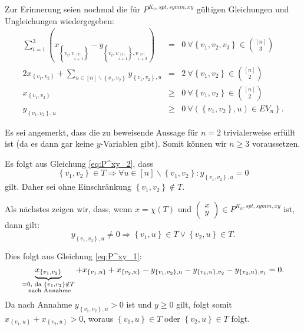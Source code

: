 \documentclass[10p,a4paper,BCOR = 12mm, DIV=15]{scrbook}
\begin{document}
\begin{bew}
Zur Erinnerung seien nochmal die für $P^{K_n, spt, symm, xy}$ gültigen Gleichungen und Ungleichungen wiedergegeben:
\begin{eqnarray}
\sum_{i=1}^3 \left(x_{\left\{v_{i}, v_{i \stackrel{\left[3\right]}{+} 1}\right\}} -  y_{\left\{v_{i}, v_{i \stackrel{\left[3\right]}{+} 1}\right\}, v_{i \stackrel{\left[3\right]}{+} 2}}\right) & = & 0\ \forall \left\{v_1, v_2, v_3\right\}\in {[n] \choose 3} \label{eq:P^xy_1} \\
2 x_{\left\{v_1, v_2\right\}} + \sum_{u\in[n]\backslash\left\{v_1, v_2\right\}} y_{\left\{v_1, v_2\right\}, u} & = & 2\ \forall \left\{v_1, v_2\right\}\in {[n] \choose 2} \label{eq:P^xy_2} \\
x_{\left\{v_1, v_2\right\}} & \geq & 0 \ \forall \left\{v_1, v_2\right\} \in {\left[n\right] \choose 2} \nonumber \\
y_{\left\{v_1, v_2\right\}, u} & \geq & \left.0 \ \forall \left(\left\{v_1, v_2\right\}, u\right) \in EV_n\right\}. \nonumber
\end{eqnarray}

Es sei angemerkt, dass die zu beweisende Aussage für $n=2$ trivialerweise erfüllt ist (da es dann gar keine $y$-Variablen gibt). Somit können wir $n\geq 3$ voraussetzen.

Es folgt aus Gleichung \eqref{eq:P^xy_2}, dass
\begin{displaymath}
\left\{v_1, v_2\right\} \in T \Rightarrow \forall u \in \left[n\right] \backslash \left\{v_1, v_2\right\}: y_{\left\{v_1, v_2\right\}, u} = 0
\end{displaymath}
gilt. Daher sei ohne Einschränkung $\left\{v_1, v_2\right\} \notin T$.

Als nächstes zeigen wir, dass, wenn $x=\chi(T)$ und $\left(\begin{array}{c}
x \\
y
\end{array}\right) \in P^{K_n, spt, symm, xy}$ ist, dann gilt:
\begin{displaymath}
y_{\left\{v_1, v_2\right\}, u} \neq 0 \Rightarrow \left\{v_1, u\right\} \in T \vee \left\{v_2, u\right\} \in T.
\end{displaymath}

Dies folgt aus Gleichung \eqref{eq:P^xy_1}:
\begin{equation}
\underbrace{x_{\left\{v_1, v_2\right\}}}_{\substack{= 0,\textnormal{ da }\left\{v_1, v_2\right\}\notin T \\ \textnormal{ nach Annahme}}} + x_{\left\{v_1, u\right\}} + x_{\left\{v_2, u\right\}} -  y_{\left\{v_1, v_2\right\}, u} - y_{\left\{v_1, u\right\}, v_2} - y_{\left\{v_2, u\right\}, v_1} = 0. \label{eq:xy_neq0}
\end{equation}
Da nach Annahme $y_{\left\{v_1, v_2\right\}, u} > 0$ ist und $y\geq 0$ gilt, folgt somit $ x_{\left\{v_1, u\right\}} + x_{\left\{v_2, u\right\}} > 0$, woraus $\left\{v_1, u\right\} \in T$ oder $\left\{v_2, u\right\} \in T$ folgt.


\end{bew}
\end{document}

